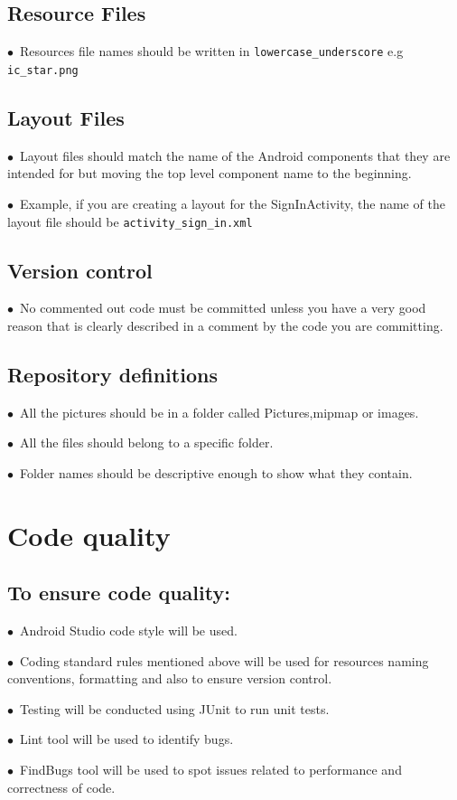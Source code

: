 \documentclass[english]{article}
\begin{document}
\subsection{Resource Files}
$\bullet$\ Resources file names should be written in  \texttt{lowercase\_underscore}  e.g  \texttt{ic\_star.png} \par


\subsection{Layout Files}

$\bullet$\ Layout files should match the name of the Android components that they are intended for but moving the top level component name to the beginning. \par
$\bullet$\ Example, if you are creating a layout for the SignInActivity, the name of the layout file should be \texttt{activity\_sign\_in.xml} \par


\subsection{Version control}
$\bullet$\ No commented out code must be committed unless you have a very good reason that is clearly described in a comment by the code you are committing. \par


\subsection{Repository definitions}
$\bullet$\ All the pictures should be in a folder called Pictures,mipmap or images. \par
$\bullet$\ All the files should belong to a specific folder. \par
$\bullet$\ Folder names should be descriptive enough to show what they contain. \par

\section{Code quality}
\subsection{To ensure code quality:}
$\bullet$\ Android Studio code style will be used. \par
$\bullet$\ Coding standard rules mentioned above will be used for resources naming conventions, formatting and also to ensure version control.
 \par
$\bullet$\ Testing will be conducted using JUnit to run unit tests. \par
$\bullet$\ Lint tool will be used to identify bugs. \par
$\bullet$\ FindBugs tool will be used to spot issues related to performance and correctness of code. \par
\end{document}
